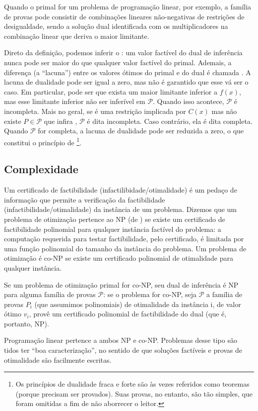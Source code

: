 \documentclass{article}
\begin{document}
Quando o primal for um problema de programação linear, por exemplo, a família de provas pode
consistir de combinações lineares não-negativas de restrições de desigualdade, sendo a solução dual
identificada com os multiplicadores na combinação linear que deriva o maior limitante.

Direto da definição, podemos inferir o : um valor factível
 do dual de inferência nunca pode ser maior do que qualquer valor factível do primal.
Ademais, a diferença (a ``lacuna'') entre os valores ótimos do primal e do dual é chamada
. A lacuna de dualidade pode ser igual a zero, mas não é garantido
que esse vá ser o caso. Em particular, pode ser que exista um maior limitante inferior a $f(x)$, mas
esse limitante inferior não ser inferível em $\mathcal{P}$. Quando isso acontece, $\mathcal{P}$ é
incompleta. Mais no geral, se  é uma restrição implicada por $C(x)$ mas não existe $P \in
\mathcal{P}$ que infira , $\mathcal{P}$ é dita incompleta. Caso contrário, ela é dita
completa. Quando $\mathcal{P}$ for completa, a lacuna de dualidade pode ser reduzida a zero, o que
constitui o princípio de \footnote{Os princípios de dualidade fraca e
  forte são às vezes referidos como teoremas (porque precisam ser provados). Suas provas, no
  entanto, são tão simples, que foram omitidas a fim de não aborrecer o leitor.}.

\subsection{Complexidade}

Um certificado de factibilidade (infactilibidade/otimalidade) é um pedaço de
informação que permite a verificação da factibilidade (infactibilidade/otimalidade) da instância de
um problema. Dizemos que um problema de otimização pertence ao NP (de ) se existe um certificado de factibilidade polinomial para qualquer instância factível
do problema: a computação requerida para testar factibilidade, pelo certificado, é limitada por uma
função polinomial do tamanho da instância do problema. Um problema de otimização é co-NP se existe
um certificado polinomial de otimalidade para qualquer instância.

Se um problema de otimização primal for co-NP, seu dual de inferência é NP para alguma família de
provas $\mathcal{P}$: se o problema for co-NP, seja $\mathcal{P}$ a família de provas $P_i$ (que
assumimos polinomiais) de otimalidade da instância i, de valor ótimo $v_i$, provê um certificado
polinomial de factibilidade do dual (que é, portanto, NP).

Programação linear pertence a ambos NP e co-NP. Problemas desse tipo são tidos ter ``boa
caracterização'', no sentido de que soluções factíveis e provas de otimalidade são facilmente
escritas.

  \begin{thebibliography}{1}


  \end{thebibliography}
\end{document}
